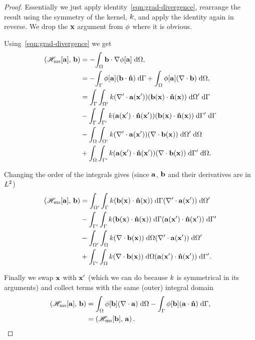 \begin{proof}

  Essentially we just apply identity~\eqref{eqn:grad-divergence}, rearrange the result using the symmetry of the kernel, $\knl$, and apply the identity again in reverse. We drop the $\xv$ argument from $\phim$ where it is obvious.

  Using~\eqref{eqn:grad-divergence} we get
  \begin{equation}
    \begin{aligned}
      \ip{\hmsop[\av]}{\bv} &= -\intd{\bv \cdot \grad \phim[\av] }, \\
      &= - \intb{\phim[\av] (\bv \cdot \nv)} + \intd{\phim[\av] (\div \bv) }, \\
      &= \intb{ \intd[\magd']{\knl (\nabla' \cdot \av(\xv')) (\bv(\xv) \cdot \nv(\xv))}} \\
      &- \intb{ \intd[\boundd']{\knl (\av(\xv') \cdot \nv(\xv')) (\bv(\xv) \cdot \nv(\xv))}} \\
      &- \intd{ \intd[\magd']{\knl (\nabla' \cdot \av(\xv')) (\div \bv(\xv))}} \\
      &+ \intd{ \intd[\boundd']{\knl (\av(\xv') \cdot \nv(\xv')) (\div \bv(\xv))}}.
    \end{aligned}
  \end{equation}

Changing the order of the integrals gives (since $\av$, $\bv$ and their derivatives are in $\ltwo$)
  \begin{equation}
    \begin{aligned}
      \ip{\hmsop[\av]}{\bv}
      &= \intd[\magd']{ \intb{\knl (\bv(\xv) \cdot \nv(\xv))} (\nabla' \cdot \av(\xv'))} \\
      &- \intd[\boundd']{ \intb{\knl (\bv(\xv) \cdot \nv(\xv))} (\av(\xv') \cdot \nv(\xv'))} \\
      &- \intd[\magd']{ \intd{\knl (\div \bv(\xv))} (\nabla' \cdot \av(\xv'))} \\
      &+ \intd[\boundd']{ \intd{\knl (\div \bv(\xv))} (\av(\xv') \cdot \nv(\xv'))}.
    \end{aligned}
  \end{equation}

  Finally we swap $\xv$ with $\xv'$ (which we can do because $\knl$ is symmetrical in its arguments) and collect terms with the same (outer) integral domain
  \begin{equation}
    \begin{aligned}
      \ip{\hmsop[\av]}{\bv} &= \intd{\phi[\bv] (\div \av)} - \intb{\phi[\bv] (\av \cdot \nv)}, \\
      & = \ip{\hmsop[\bv]}{\av}.
    \end{aligned}
  \end{equation}

\end{proof}


